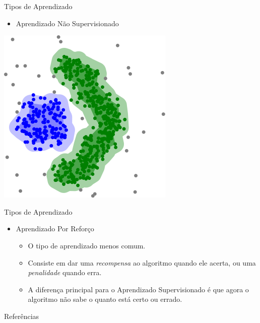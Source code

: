 \documentclass{libs/ufc_format}
\begin{document}
\begin{frame}{Tipos de Aprendizado}
    \begin{itemize}
        \item Aprendizado Não Supervisionado
    \end{itemize}
    \centering
    \includegraphics[scale=0.45]{media/dbscan_density_data}
\end{frame}

\begin{frame}{Tipos de Aprendizado}
    \begin{itemize}
        \item Aprendizado Por Reforço
            \begin{itemize}
                \justifying
                \item O tipo de aprendizado menos comum.
                \item<2-> Consiste em dar uma \textit{recompensa} ao algoritmo quando ele acerta, ou uma \textit{penalidade} quando erra.
                \item<3-> A diferença principal para o Aprendizado Supervisionado é que agora o algoritmo não sabe o quanto está certo ou errado.
            \end{itemize}
    \end{itemize}
\end{frame}


\begin{frame}[allowframebreaks]{Referências}
    \scriptsize
    \printbibliography
\end{frame}
\end{document}
